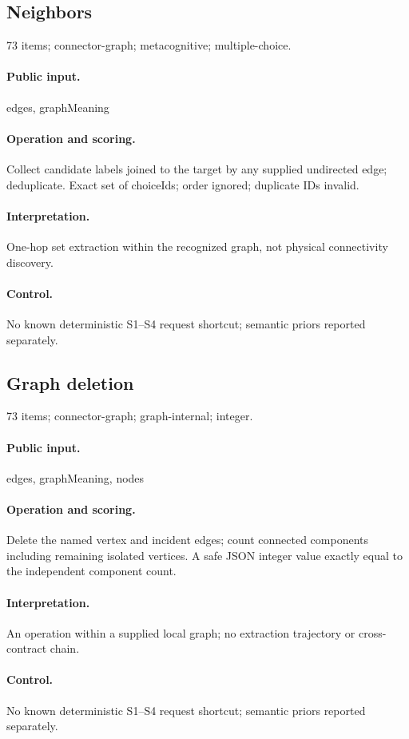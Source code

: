 \subsection{Neighbors}
73 items; connector-graph; metacognitive; multiple-choice.
\paragraph{Public input.}edges, graphMeaning
\paragraph{Operation and scoring.}Collect candidate labels joined to the target by any supplied undirected edge; deduplicate. Exact set of choiceIds; order ignored; duplicate IDs invalid.
\paragraph{Interpretation.}One-hop set extraction within the recognized graph, not physical connectivity discovery.
\paragraph{Control.}No known deterministic S1--S4 request shortcut; semantic priors reported separately.
\subsection{Graph deletion}
73 items; connector-graph; graph-internal; integer.
\paragraph{Public input.}edges, graphMeaning, nodes
\paragraph{Operation and scoring.}Delete the named vertex and incident edges; count connected components including remaining isolated vertices. A safe JSON integer value exactly equal to the independent component count.
\paragraph{Interpretation.}An operation within a supplied local graph; no extraction trajectory or cross-contract chain.
\paragraph{Control.}No known deterministic S1--S4 request shortcut; semantic priors reported separately.
